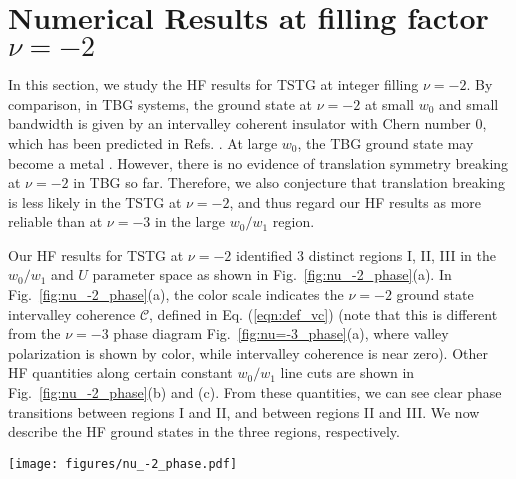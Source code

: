 \documentclass[prb,aps,nofootinbib,amssymb,twocolumn,superscriptaddress,10pt]{revtex4-2}
\begin{document}
\section{Numerical Results at filling factor \texorpdfstring{$\nu=-2$}{nu=-2}}\label{sec:nu_-2}
In this section, we study the HF results for TSTG at integer filling $\nu=-2$. By comparison, in TBG systems, the ground state at $\nu=-2$ at small $w_0$ and small bandwidth is given by an intervalley coherent insulator with Chern number $0$, which has been predicted in Refs. \cite{KAN18,BUL20,ZHA20,LIA20,XIE20a}. At large $w_0$, the TBG ground state may become a metal \cite{BER20b}. However, there is no evidence of translation symmetry breaking at $\nu=-2$ in TBG so far. Therefore, we also conjecture that translation breaking is less likely in the TSTG at $\nu=-2$, and thus regard our HF results as more reliable than at $\nu=-3$ in the large $w_0/w_1$ region. 


Our HF results for TSTG at $\nu=-2$ identified 3 distinct regions I, II, III in the $w_0/w_1$ and $U$ parameter space as shown in Fig.~\ref{fig:nu_-2_phase}(a). In Fig.~\ref{fig:nu_-2_phase}(a), the color scale indicates the $\nu=-2$ ground state intervalley coherence $\mathcal{C}$, defined in Eq. (\ref{eqn:def_vc}) (note that this is different from the $\nu=-3$ phase diagram Fig.~\ref{fig:nu=-3_phase}(a), where valley polarization is shown by color, while intervalley coherence is near zero). Other HF quantities along certain constant $w_0/w_1$ line cuts are shown in Fig.~\ref{fig:nu_-2_phase}(b) and (c). From these quantities, we can see clear phase transitions between regions I and II, and between regions II and III. We now describe the HF ground states in the three regions, respectively.


\begin{figure*}[!htbp]
	\centering
	\texttt{[image: figures/nu\_-2\_phase.pdf]}
	\caption{(a) The phase diagram at filling factor $\nu=-2$ obtained on a $8\times 8$ momentum lattice in the $(w_0, U)$ plane, and the color represents the intervalley coherence, which is defined in Eq. (\ref{eqn:def_vc}). (b) and (c) The displacement field dependence of physical quantities $\mathcal{C}, N_v, \mathrm{Ch}$ and $S^\pm$ on a $8\times 8$ at fixed $w_0/w_1 = 0.2$ (b) and $w_0/w_1 = 0.8$ (c). By considering the different HF parameters and band structure, we can define three different regions in the phase diagram, denoted I, II and III in (a).}
	\label{fig:nu_-2_phase}
\end{figure*}
\end{document}
